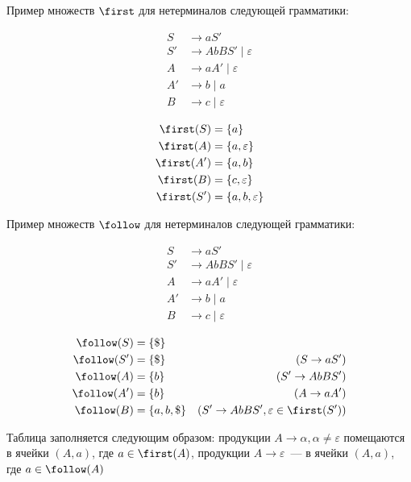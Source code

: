 Пример множеств $\first$ для нетерминалов следующей грамматики:

\begin{multicols}{2}
\begin{align*}
  S  &\to a S' \\
  S' &\to A b B S' \mid \varepsilon \\
  A  &\to a A' \mid \varepsilon \\
  A' &\to b \mid a \\
  B  &\to c \mid \varepsilon
\end{align*}

\columnbreak

\begin{align*}
  \first(S)  &= \{ a \} \\
  \first(A)  &= \{ a, \varepsilon \} \\
  \first(A') &= \{ a, b \} \\
  \first(B)  &= \{ c, \varepsilon \} \\
  \first(S') &= \{ a, b, \varepsilon \}
\end{align*}
\end{multicols}

Пример множеств $\follow$ для нетерминалов следующей грамматики:

\begin{multicols}{2}
\begin{align*}
  S  &\to a S' \\
  S' &\to A b B S' \mid \varepsilon \\
  A  &\to a A' \mid \varepsilon \\
  A' &\to b \mid a \\
  B  &\to c \mid \varepsilon
\end{align*}

\columnbreak

\begin{align*}
  \follow(S)  &= \{ \$ \} & \\
  \follow(S') &= \{ \$ \} &(S \to a S')\\
  \follow(A)  &= \{ b \}  &(S' \to A b B S') \\
  \follow(A') &= \{ b \}  &(A \to a A')\\
  \follow(B)  &= \{ a, b, \$ \} &(S' \to A b B S', \varepsilon \in \first(S'))
\end{align*}
\end{multicols}

Таблица заполняется следующим образом: продукции $A \to \alpha, \alpha \neq \varepsilon$ помещаются в ячейки $(A, a)$, где $a \in \first(A)$, продукции $A \to \varepsilon$~--- в ячейки $(A, a)$, где $a \in \follow(A)$

